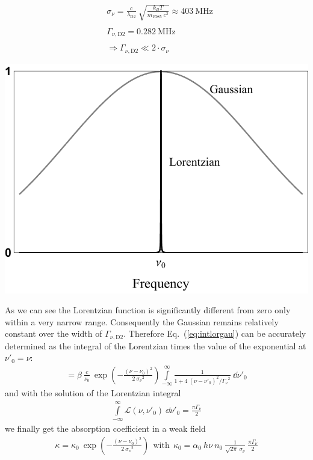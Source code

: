 \begin{minipage}[c][][c]{.45\textwidth}
\centering
\begin{align*}
    &\sigma_\nu = \frac{c}{\lambda_\mathrm{D2}}~\sqrt{\frac{k_B T}{m_{Rb85}~c^2}} 
    \approx \SI{403}{\mega\hertz} \\ \\
    &\Gamma_{\nu,\mathrm{D2}} = \SI{0.282}{\mega\hertz} \\ \\
    &\Rightarrow \Gamma_{\nu,\mathrm{D2}} \ll 2\cdot\sigma_\nu
\end{align*}
\end{minipage}
\hfill
\begin{minipage}[c]{.45\textwidth}
\includegraphics[width=\textwidth]{gauvslor}
\end{minipage}
\bigskip

As we can see the Lorentzian function is significantly different from zero only 
within a very narrow range. Consequently the Gaussian remains relatively constant 
over the width of \(\Gamma_{\nu,\mathrm{D2}} \). Therefore Eq.~(\ref{eq:intlorgau}) 
can be accurately determined as the integral of the Lorentzian times the 
value of the exponential at \(\nu'_0 = \nu \):
\begin{align}
    = \beta~\frac{c}{\nu_0}~
    \exp{ \left ( -\frac{{(\nu - \nu_0)}^2 }{2~{\sigma_\nu}^2 } \right )} 
    \int\limits_{-\infty}^{\infty} \frac{1}{ 1+4~{(\nu-\nu'_0)}^2 / {\Gamma_\nu}^2 }~
    \dd \nu'_0
\end{align}
and with the solution of the Lorentzian integral
\begin{align}
    \int\limits_{-\infty}^{\infty} \mathcal{L}(\nu,\nu'_0)~\dd \nu'_0 = 
    \frac{\pi \Gamma_\nu}{2}
\end{align}
we finally get the absorption coefficient in a weak field
\begin{align}\label{eq:kappa_weakfield}
    \kappa = \kappa_0~\exp{ \left ( -\frac{{(\nu - \nu_0)}^2 }{2~{\sigma_\nu}^2 } \right )}
     ~~\text{with}~~ \kappa_0 = \alpha_0 ~ h\nu ~ n_0 ~ \frac{1}{\sqrt{2\pi}~\sigma_\nu}~
     \frac{\pi \Gamma_\nu}{2}
\end{align}


